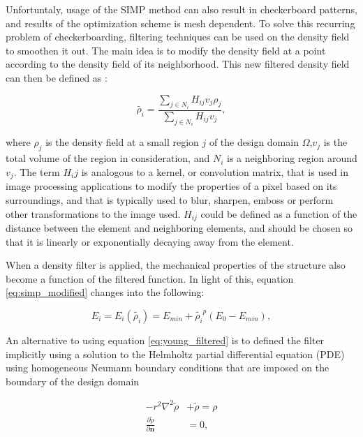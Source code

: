\documentclass[../main.tex]{subfiles}
\begin{document}
Unfortuntaly, usage of the SIMP method can also result in checkerboard patterns, and results of the optimization scheme is mesh dependent. To solve this recurring problem of checkerboarding, filtering techniques can be used on the density field to smoothen it out. The main idea is to modify the density field at a point according to the density field of its neighborhood. This new filtered density field can then be defined as \cite{liuEfficient3DTopology2014}:

\begin{equation}
  \tilde{\rho_i} = \frac{\sum_{j \in N_i} H_{ij} v_j \rho_j} {\sum_{j \in N_i} H_{ij} v_j},
  \label{eq:densityfilter}
\end{equation}

where $\rho_j$ is the density field at a small region $j$ of the design domain $\Omega$,$v_j$ is the total volume of the region in consideration, and $N_i$ is a neighboring region around $v_j$. The term $H_ij$ is analogous to a kernel, or convolution matrix, that is used in image processing applications to modify the properties of a pixel based on its surroundings, and that is typically used to blur, sharpen, emboss or perform other transformations to the image used. $H_{ij}$ could be defined as a function of the distance between the element and neighboring elements, and should be chosen so that it is linearly or exponentially decaying away from the element.

When a density filter is applied, the mechanical properties of the structure also become a function of the filtered function. In light of this, equation \ref{eq:simp_modified} changes into the following:

\begin{equation}
  E_i = E_i(\tilde{\rho_i}) = E_{min} + \tilde{\rho_i}^p (E_0 - E_{min}),
  \label{eq:young_filtered}
\end{equation}


An alternative to using equation \ref{eq:young_filtered} is to defined the filter implicitly using a solution to the Helmholtz partial differential equation (PDE) using homogeneous Neumann boundary conditions that are imposed on the boundary of the design domain \cite{lazarovFiltersTopologyOptimization2011}

\begin{align}
  -r^2 \nabla ^2 \tilde{\rho} &+ \tilde{\rho} = \rho \label{eq:Helmholtz}\\ 
 \frac{\partial{\tilde{\rho}}}{\partial {\bm{n}}} &= 0 \nonumber,
\end{align}
\end{document}
